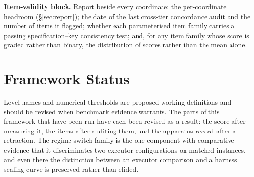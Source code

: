 \documentclass[11pt]{article}
\theoremstyle{definition}
\begin{document}
\noindent\textbf{Item-validity block.} Report beside every coordinate: the per-coordinate headroom (\S\ref{sec:report}); the date of the last cross-tier concordance audit and the number of items it flagged; whether each parameterised item family carries a passing specification--key consistency test; and, for any item family whose score is graded rather than binary, the distribution of scores rather than the mean alone.

\section{Framework Status}

Level names and numerical thresholds are proposed working definitions and should be revised when benchmark evidence warrants. The parts of this framework that have been run have each been revised as a result: the score after measuring it, the items after auditing them, and the apparatus record after a retraction. The regime-switch family is the one component with comparative evidence that it discriminates two executor configurations on matched instances, and even there the distinction between an executor comparison and a harness scaling curve is preserved rather than elided.
\end{document}
